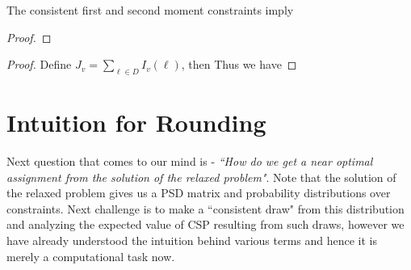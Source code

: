 \begin{remark}
The consistent first and second moment constraints imply 
\end{remark}
\begin{proof}
\end{proof}
\begin{remark}
\end{remark}
\begin{proof}
Define $J_v = \sum_{\ell \in D} I_v(\ell)$, then 
Thus we have 
\end{proof}

\section{Intuition for Rounding}
Next question that comes to our mind is - 
\textit{``How do we get a near optimal assignment from the solution of the relaxed problem"}. 
Note that the solution of the relaxed problem gives us a PSD matrix and probability distributions over constraints. 
Next challenge is to make a ``consistent draw" from this distribution and analyzing the expected value of CSP resulting from such draws, 
however we have already understood the intuition behind various terms and hence it is merely a computational task now.  

